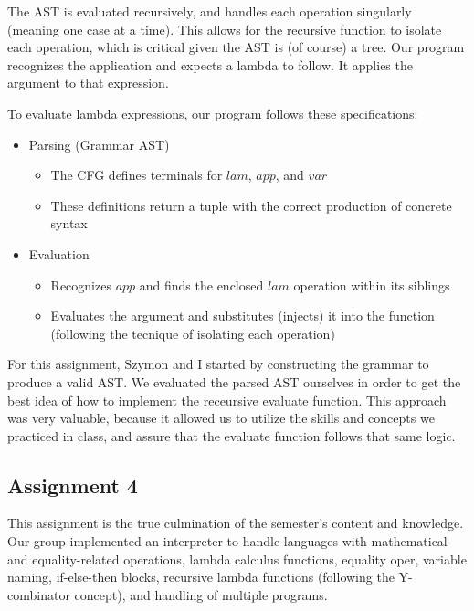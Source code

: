 \documentclass{article}
\theoremstyle{theorem}
\theoremstyle{definition}
\theoremstyle{remark}
\begin{document}
The AST is evaluated recursively, and handles each operation singularly (meaning one case at a time). This allows for the recursive function to isolate each operation, which is critical given the AST is (of course) a tree. Our program recognizes the application and expects a lambda to follow. It applies the argument to that expression. 

To evaluate lambda expressions, our program follows these specifications:

\begin{itemize}
  \item Parsing (Grammar \textrightarrow AST)
    \begin{itemize}
      \item The CFG defines terminals for $lam$, $app$, and $var$
      \item These definitions return a tuple with the correct production of concrete syntax
    \end{itemize}
  \item Evaluation
    \begin{itemize}
      \item Recognizes $app$ and finds the enclosed $lam$ operation within its siblings
      \item Evaluates the argument and substitutes (injects) it into the function (following the tecnique of isolating each operation)
    \end{itemize}
\end{itemize}

For this assignment, Szymon and I started by constructing the grammar to produce a valid AST. We evaluated the parsed AST ourselves in order to get the best idea of how to implement the receursive evaluate function. This approach was very valuable, because it allowed us to utilize the skills and concepts we practiced in class, and assure that the evaluate function follows that same logic.

\subsection{Assignment 4}

This assignment is the true culmination of the semester's content and knowledge. Our group implemented an interpreter to handle languages with mathematical and equality-related operations, lambda calculus functions, equality oper, variable naming, if-else-then blocks, recursive lambda functions (following the Y-combinator concept), and handling of multiple programs. 
\end{document}
